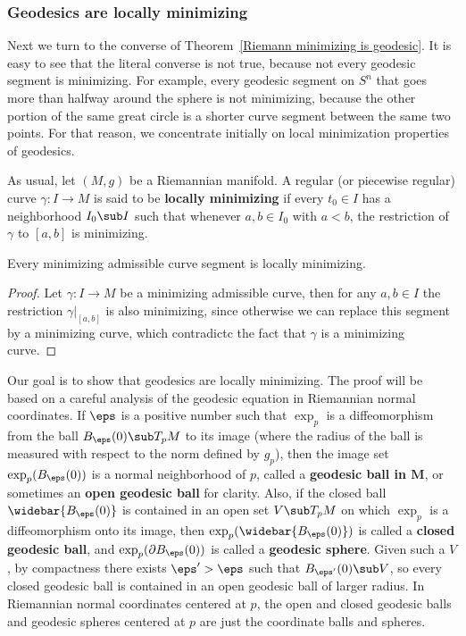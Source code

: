 \subsubsection{Geodesics are locally minimizing}
Next we turn to the converse of Theorem~\ref{Riemann minimizing is geodesic}. It is easy to see that the literal converse is not true, because not every geodesic segment is 
minimizing. For example, every geodesic segment on $S^n$ that goes more than halfway around the sphere is not minimizing, because the other portion of the same great 
circle is a shorter curve segment between the same two points. For that reason, we concentrate initially on local minimization properties of geodesics.\par
As usual, let $(M,g)$ be a Riemannian manifold. A regular (or piecewise regular) curve $\gamma:I\to M$ is said to be \textbf{locally minimizing} if every $t_0\in I$ has a 
neighborhood $I_0\sub I$ such that whenever $a,b\in I_0$ with $a<b$, the restriction of $\gamma$ to $[a,b]$ is minimizing.
\begin{lemma}\label{Riemann minimizing is local minimizing}
Every minimizing admissible curve segment is locally minimizing.
\end{lemma}
\begin{proof}
Let $\gamma:I\to M$ be a minimizing admissible curve, then for any $a,b\in I$ the restriction $\gamma|_{[a,b]}$ is also minimizing, since otherwise we can replace this 
segment by a minimizing curve, which contradictc the fact that $\gamma$ is a minimizing curve.
\end{proof}
Our goal is to show that geodesics are locally minimizing. The proof will be based on a careful analysis of the geodesic equation in Riemannian normal coordinates. If $\eps$ is a positive number such that $\exp_p$ is a diffeomorphism from the ball $B_\eps(0)\sub T_pM$ to its image (where the radius of the ball is measured with respect to the norm defined by $g_p$), then the image set $\exp_p(B_\eps(0))$ is a normal neighborhood of $p$, called a \textbf{geodesic ball in $\bm{M}$}, or sometimes an \textbf{open geodesic ball} for clarity. Also, if the closed ball $\widebar{B_{\eps}(0)}$ is contained in an open set $V\sub T_pM$ on which $\exp_p$ is a diffeomorphism onto its image, then $\exp_p(\widebar{B_\eps(0)})$ is called a \textbf{closed geodesic ball}, and $\exp_p(\partial B_\eps(0))$ is called a \textbf{geodesic sphere}. Given such a $V$, by compactness there exists $\eps'>\eps$ such that $B_{\eps'}(0)\sub V$, so every closed geodesic ball is contained in an open geodesic ball of larger radius. In Riemannian normal coordinates centered at $p$, the open and closed geodesic balls and geodesic spheres centered at $p$ are just the coordinate balls and spheres.\par
